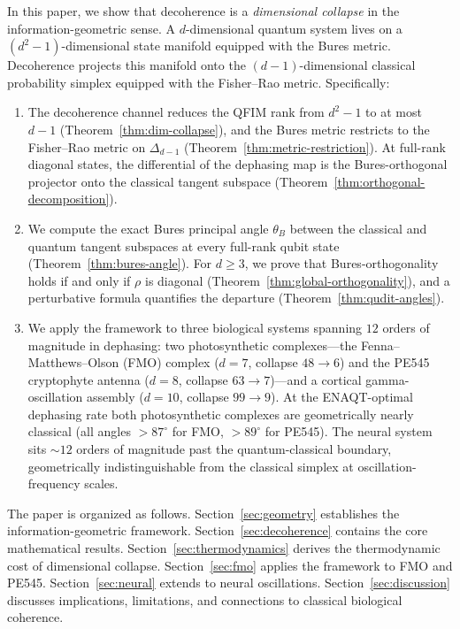 \documentclass[12pt,a4paper]{article}
\theoremstyle{definition}
\theoremstyle{remark}
\begin{document}
In this paper, we show that decoherence is a \emph{dimensional collapse} in the information-geometric sense. A $d$-dimensional quantum system lives on a $(d^2{-}1)$-dimensional state manifold equipped with the Bures metric. Decoherence projects this manifold onto the $(d{-}1)$-dimensional classical probability simplex equipped with the Fisher--Rao metric. Specifically:
\begin{enumerate}
\item[\emph{(Collapse.)}] The decoherence channel reduces the QFIM rank from $d^2{-}1$ to at most $d{-}1$ (Theorem~\ref{thm:dim-collapse}), and the Bures metric restricts to the Fisher--Rao metric on $\Delta_{d-1}$ (Theorem~\ref{thm:metric-restriction}). At full-rank diagonal states, the differential of the dephasing map is the Bures-orthogonal projector onto the classical tangent subspace (Theorem~\ref{thm:orthogonal-decomposition}).
\item[\emph{(Geometry of the split.)}] We compute the exact Bures principal angle $\theta_B$ between the classical and quantum tangent subspaces at every full-rank qubit state (Theorem~\ref{thm:bures-angle}). For $d \geq 3$, we prove that Bures-orthogonality holds if and only if $\rho$ is diagonal (Theorem~\ref{thm:global-orthogonality}), and a perturbative formula quantifies the departure (Theorem~\ref{thm:qudit-angles}).
\item[\emph{(Application.)}] We apply the framework to three biological systems spanning $12$ orders of magnitude in dephasing: two photosynthetic complexes---the Fenna--Matthews--Olson (FMO) complex ($d = 7$, collapse $48 \to 6$) and the PE545 cryptophyte antenna ($d = 8$, collapse $63 \to 7$)---and a cortical gamma-oscillation assembly ($d = 10$, collapse $99 \to 9$). At the ENAQT-optimal dephasing rate both photosynthetic complexes are geometrically nearly classical (all angles $> 87^\circ$ for FMO, $> 89^\circ$ for PE545). The neural system sits ${\sim}12$ orders of magnitude past the quantum-classical boundary, geometrically indistinguishable from the classical simplex at oscillation-frequency scales.
\end{enumerate}

The paper is organized as follows. Section~\ref{sec:geometry} establishes the information-geometric framework. Section~\ref{sec:decoherence} contains the core mathematical results. Section~\ref{sec:thermodynamics} derives the thermodynamic cost of dimensional collapse. Section~\ref{sec:fmo} applies the framework to FMO and PE545. Section~\ref{sec:neural} extends to neural oscillations. Section~\ref{sec:discussion} discusses implications, limitations, and connections to classical biological coherence.
\end{document}
